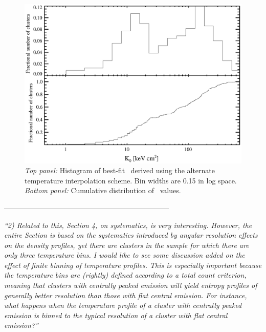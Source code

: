 \documentclass[11pt]{article}
\begin{document}
\begin{figure}[htp]
  \begin{center}
    \begin{minipage}[htp]{0.9\linewidth}
      \includegraphics*[width=\textwidth, trim=20mm 10mm 10mm 10mm, clip]{k0hist_itpl.eps}
      \caption{{\it{Top panel:}} Histogram of best-fit \kna\ derived
      using the alternate temperature interpolation scheme. Bin widths
      are 0.15 in log space. {\it{Bottom panel:}} Cumulative
      distribution of \kna\ values.}
      \label{fig:k0hist}
    \end{minipage}
  \end{center}
\end{figure}

---------------------------------------------------------------------

{\it{``2) Related to this, Section 4, on systematics, is very
    interesting. However, the entire Section is based on the
    systematics introduced by angular resolution effects on the
    density profiles, yet there are clusters in the sample for which
    there are only three temperature bins. I would like to see some
    discussion added on the effect of finite binning of temperature
    profiles. This is especially important because the temperature
    bins are (rightly) defined according to a total count criterion,
    meaning that clusters with centrally peaked emission will yield
    entropy profiles of generally better resolution than those with
    flat central emission. For instance, what happens when the
    temperature profile of a cluster with centrally peaked emission is
    binned to the typical resolution of a cluster with flat central
    emission?''}}
\end{document}
